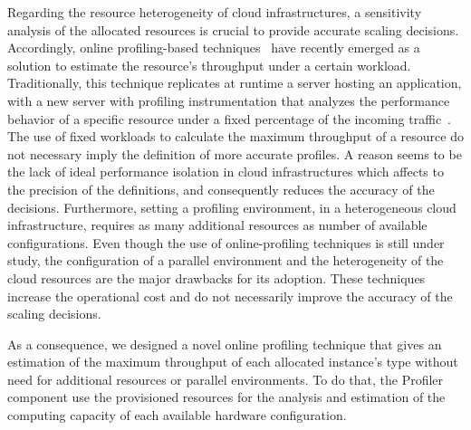 Regarding the resource heterogeneity of cloud infrastructures, a sensitivity analysis of the allocated resources is crucial to provide accurate scaling decisions. Accordingly, online profiling-based techniques~\cite{kaviani_profiling-as--service:_2011} have recently emerged as a solution to  estimate the resource's throughput under a certain workload. Traditionally, this technique replicates at runtime a server hosting an application, with a new server with profiling instrumentation that analyzes the performance behavior of a specific resource under a fixed percentage of the incoming traffic~\cite{jiangThesis,dejavu2012}. The use of fixed workloads to calculate the maximum throughput of a resource do not necessary imply the definition of more accurate profiles. A reason seems to be the lack of ideal performance isolation in cloud infrastructures which affects to the precision of the definitions, and consequently reduces the accuracy of the decisions. Furthermore, setting a profiling environment, in a heterogeneous cloud infrastructure, requires as many additional resources as number of available configurations. Even though the use of online-profiling techniques is still under study, the configuration of a parallel environment and the heterogeneity of the cloud resources are the major drawbacks for its adoption. These techniques increase the operational cost and do not necessarily improve the accuracy of the scaling decisions.


As a consequence, we designed a novel online profiling technique that gives an estimation of the maximum throughput of each allocated instance's type without need for additional resources or parallel environments. To do that, the Profiler component use the provisioned resources for the analysis and estimation of the computing capacity of each available hardware configuration.

